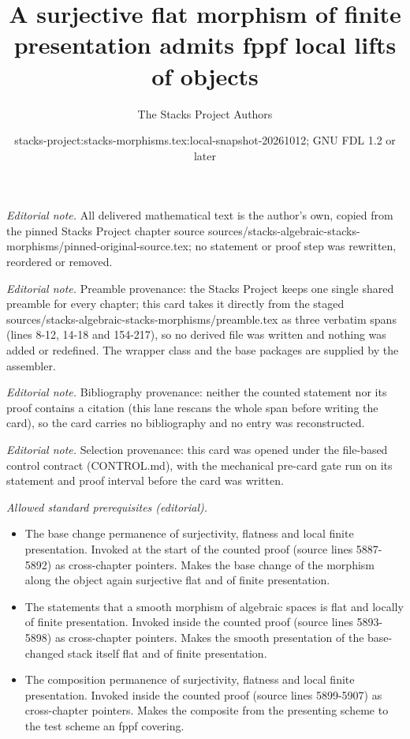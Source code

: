 \documentclass[10pt,a4paper]{amsart}
\title{A surjective flat morphism of finite presentation admits fppf local lifts of objects}
\author{The Stacks Project Authors}
\date{stacks-project:stacks-morphisms.tex:local-snapshot-20261012; GNU FDL 1.2 or later}
\theoremstyle{plain}
\theoremstyle{definition}
\theoremstyle{remark}
\numberwithin{equation}{subsection}
\begin{document}
\maketitle
\noindent\textit{Editorial note.} All delivered mathematical text is the author's own, copied from the pinned Stacks Project chapter source sources/stacks-algebraic-stacks-morphisms/pinned-original-source.tex; no statement or proof step was rewritten, reordered or removed.\par\medskip
\noindent\textit{Editorial note.} Preamble provenance: the Stacks Project keeps one single shared preamble for every chapter; this card takes it directly from the staged sources/stacks-algebraic-stacks-morphisms/preamble.tex as three verbatim spans (lines 8-12, 14-18 and 154-217), so no derived file was written and nothing was added or redefined. The wrapper class and the base packages are supplied by the assembler.\par\medskip
\noindent\textit{Editorial note.} Bibliography provenance: neither the counted statement nor its proof contains a citation (this lane rescans the whole span before writing the card), so the card carries no bibliography and no entry was reconstructed.\par\medskip
\noindent\textit{Editorial note.} Selection provenance: this card was opened under the file-based control contract (CONTROL.md), with the mechanical pre-card gate run on its statement and proof interval before the card was written.\par\medskip
\noindent\textit{Allowed standard prerequisites (editorial).}\begin{itemize}
\item The base change permanence of surjectivity, flatness and local finite presentation. Invoked at the start of the counted proof (source lines 5887-5892) as cross-chapter pointers. Makes the base change of the morphism along the object again surjective flat and of finite presentation.
\item The statements that a smooth morphism of algebraic spaces is flat and locally of finite presentation. Invoked inside the counted proof (source lines 5893-5898) as cross-chapter pointers. Makes the smooth presentation of the base-changed stack itself flat and of finite presentation.
\item The composition permanence of surjectivity, flatness and local finite presentation. Invoked inside the counted proof (source lines 5899-5907) as cross-chapter pointers. Makes the composite from the presenting scheme to the test scheme an fppf covering.
\end{itemize}\medskip
\end{document}

